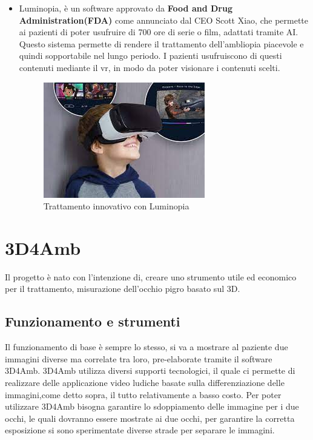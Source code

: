 \documentclass[10pt,a4paper]{article}
\begin{document}
\begin{itemize}
		\item Luminopia, è un software approvato da  \textbf{Food and Drug Administration(FDA)} come annunciato dal CEO Scott Xiao, che permette ai pazienti di poter usufruire di 700 ore di serie o film, adattati tramite AI. Questo sistema permette di rendere il trattamento dell'ambliopia piacevole e quindi sopportabile nel lungo periodo.
		I pazienti usufruiscono di questi contenuti mediante il vr, in modo da poter visionare i contenuti scelti.
			\begin{figure}[h]
				\centering
				\includegraphics[width=0.7\linewidth]{image/luminopia}
				\caption{Trattamento innovativo con Luminopia}
				\label{fig:luminopia}
			\end{figure}
	\end{itemize}
\newpage
\null
\newpage

	\section{3D4Amb}
	Il progetto è nato con l'intenzione di, creare uno strumento utile ed economico per il trattamento, misurazione dell'occhio pigro basato sul 3D.
	
	\subsection{Funzionamento e strumenti}
	Il funzionamento di base è sempre lo stesso, si va a mostrare al paziente due immagini diverse ma correlate tra loro, pre-elaborate tramite il software 3D4Amb.
	3D4Amb utilizza diversi supporti tecnologici, il quale ci permette di realizzare delle applicazione video ludiche basate sulla differenziazione delle immagini,come detto sopra, il tutto relativamente a basso costo.
	Per poter utilizzare 3D4Amb bisogna garantire lo sdoppiamento delle immagine per i due occhi, le quali dovranno essere mostrate ai due occhi, per garantire la corretta esposizione si sono sperimentate diverse strade per separare le immagini.
\end{document}
